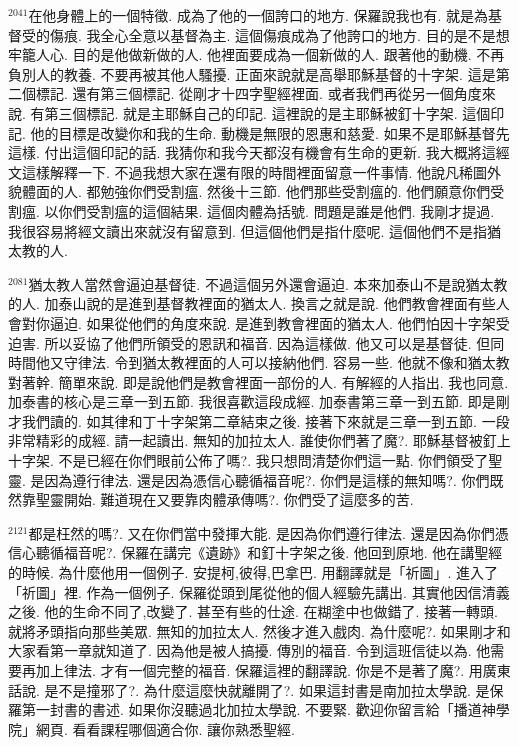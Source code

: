 \documentclass{book}
\begin{document}
$^{2041}$在他身體上的一個特徵.
成為了他的一個誇口的地方.
保羅說我也有.
就是為基督受的傷痕.
我全心全意以基督為主.
這個傷痕成為了他誇口的地方.
目的是不是想牢籠人心.
目的是他做新做的人.
他裡面要成為一個新做的人.
跟著他的動機.
不再負別人的教養.
不要再被其他人騷擾.
正面來說就是高舉耶穌基督的十字架.
這是第二個標記.
還有第三個標記.
從剛才十四字聖經裡面.
或者我們再從另一個角度來說.
有第三個標記.
就是主耶穌自己的印記.
這裡說的是主耶穌被釘十字架.
這個印記.
他的目標是改變你和我的生命.
動機是無限的恩惠和慈愛.
如果不是耶穌基督先這樣.
付出這個印記的話.
我猜你和我今天都沒有機會有生命的更新.
我大概將這經文這樣解釋一下.
不過我想大家在還有限的時間裡面留意一件事情.
他說凡稀圖外貌體面的人.
都勉強你們受割瘟.
然後十三節.
他們那些受割瘟的.
他們願意你們受割瘟.
以你們受割瘟的這個結果.
這個肉體為括號.
問題是誰是他們.
我剛才提過.
我很容易將經文讀出來就沒有留意到.
但這個他們是指什麼呢.
這個他們不是指猶太教的人.

$^{2081}$猶太教人當然會逼迫基督徒.
不過這個另外還會逼迫.
本來加泰山不是說猶太教的人.
加泰山說的是進到基督教裡面的猶太人.
換言之就是說.
他們教會裡面有些人會對你逼迫.
如果從他們的角度來說.
是進到教會裡面的猶太人.
他們怕因十字架受迫害.
所以妥協了他們所領受的恩訊和福音.
因為這樣做.
他又可以是基督徒.
但同時間他又守律法.
令到猶太教裡面的人可以接納他們.
容易一些.
他就不像和猶太教對著幹.
簡單來說.
即是說他們是教會裡面一部份的人.
有解經的人指出.
我也同意.
加泰書的核心是三章一到五節.
我很喜歡這段成經.
加泰書第三章一到五節.
即是剛才我們讀的.
如其律和丁十字架第二章結束之後.
接著下來就是三章一到五節.
一段非常精彩的成經.
請一起讀出.
無知的加拉太人.
誰使你們著了魔?.
耶穌基督被釘上十字架.
不是已經在你們眼前公佈了嗎?.
我只想問清楚你們這一點.
你們領受了聖靈.
是因為遵行律法.
還是因為憑信心聽循福音呢?.
你們是這樣的無知嗎?.
你們既然靠聖靈開始.
難道現在又要靠肉體承傳嗎?.
你們受了這麼多的苦.

$^{2121}$都是枉然的嗎?.
又在你們當中發揮大能.
是因為你們遵行律法.
還是因為你們憑信心聽循福音呢?.
保羅在講完《遺跡》和釘十字架之後.
他回到原地.
他在講聖經的時候.
為什麼他用一個例子.
安提柯,彼得,巴拿巴.
用翻譯就是「祈圖」.
進入了「祈圖」裡.
作為一個例子.
保羅從頭到尾從他的個人經驗先講出.
其實他因信清義之後.
他的生命不同了,改變了.
甚至有些的仕途.
在糊塗中也做錯了.
接著一轉頭.
就將矛頭指向那些美眾.
無知的加拉太人.
然後才進入戲肉.
為什麼呢?.
如果剛才和大家看第一章就知道了.
因為他是被人搞擾.
傳別的福音.
令到這班信徒以為.
他需要再加上律法.
才有一個完整的福音.
保羅這裡的翻譯說.
你是不是著了魔?.
用廣東話說.
是不是撞邪了?.
為什麼這麼快就離開了?.
如果這封書是南加拉太學說.
是保羅第一封書的書述.
如果你沒聽過北加拉太學說.
不要緊.
歡迎你留言給「播道神學院」網頁.
看看課程哪個適合你.
讓你熟悉聖經.
\end{document}
